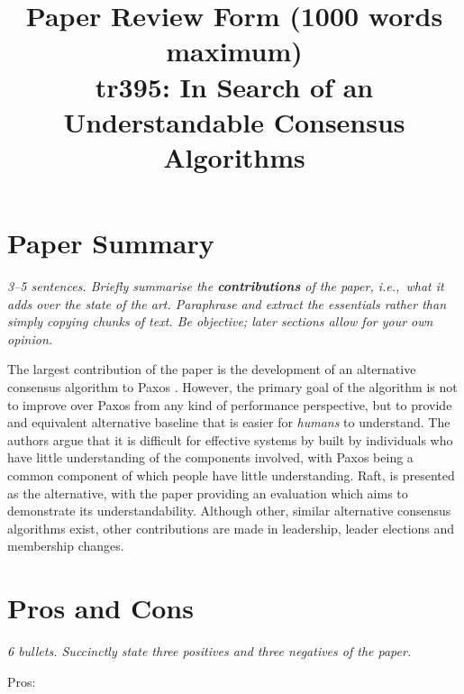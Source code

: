 \documentclass[11pt]{article}
\begin{document}

\title{Paper Review Form (1000 words maximum)\\
    tr395: In Search of an Understandable Consensus Algorithms \cite{Raft}}

\maketitle

\section*{Paper Summary}

\textsl{3--5 sentences. Briefly summarise the {\bf contributions} of the paper,
i.e.,~what it adds over the state of the art. Paraphrase and extract the
essentials rather than simply copying chunks of text. Be objective; later
sections allow for your own opinion.}

The largest contribution of the paper is the development of an alternative
consensus algorithm to Paxos \cite{Paxos}. However, the primary goal of the
algorithm is not to improve over Paxos from any kind of performance
perspective, but to provide and equivalent alternative baseline that is easier
for \textit{humans} to understand. The authors argue that it is difficult for
effective systems by built by individuals who have little understanding of the
components involved, with Paxos being a common component of which people have
little understanding. Raft, is presented as the alternative, with the paper
providing an evaluation which aims to demonstrate its understandability.
Although other, similar alternative consensus algorithms exist, other
contributions are made in leadership, leader elections and membership changes.

\section*{Pros and Cons}

\textsl{6 bullets. Succinctly state three positives and three negatives of the
paper.}

Pros:
\end{document}
